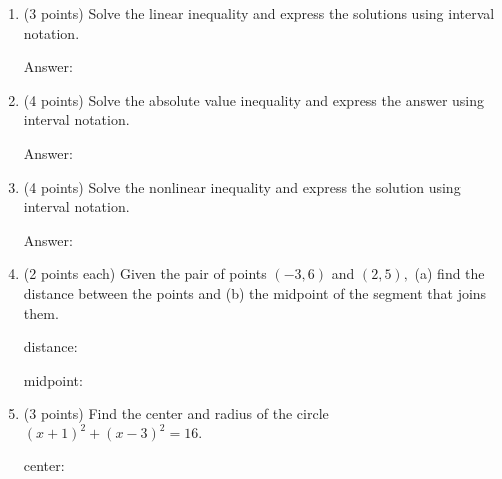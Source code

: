 \documentclass[11pt]{article}
\begin{document}
\begin{enumerate}
\item (3 points) Solve the linear inequality \scalebox{1.2}{$-2 \leq 4-6x <9$} and express the solutions using interval notation.

\begin{flushright}{Answer: \underline{\hspace{2in}}}\end{flushright}

\vspace{1in}
    \item (4 points) Solve the absolute value inequality  and express the answer using interval notation.

\begin{flushright}{Answer: \underline{\hspace{2in}}}\end{flushright}
\vspace{1in}
\item (4 points) Solve the nonlinear inequality \scalebox{1.2}{$(x-1)(x-4) < 0$} and express the solution using interval notation.

\begin{flushright}{Answer: \underline{\hspace{2in}}}\end{flushright}
\vfill
\item (2 points each) Given the pair of points $(-3,6)$ and $(2,5),$ (a) find the distance between the points and (b) the midpoint of the segment that joins them.

\begin{flushright}{distance: \underline{\hspace{2in}}}\end{flushright}

\begin{flushright}{midpoint: \underline{\hspace{2in}}}\end{flushright}

\vspace{0.25in}
\newpage
\item (3 points) Find the center and radius of the circle $(x+1)^2+(x-3)^2=16.$

\begin{flushright}{center: \underline{\hspace{2in}}}\end{flushright}


\end{enumerate}
\end{document}
